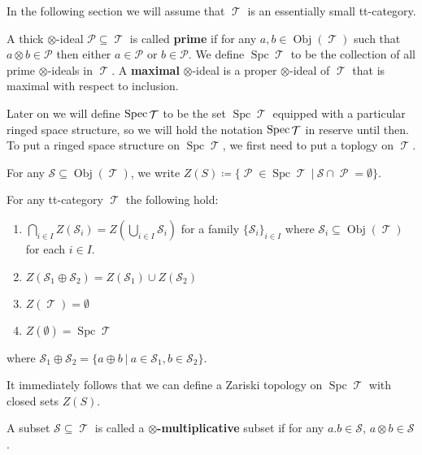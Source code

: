 \documentclass[11pt]{article}
\DeclareMathOperator{\ob}{Obj}
\DeclareMathOperator{\TT}{\mathcal{T}}
\DeclareMathOperator{\cP}{\mathcal{P}}
\DeclareMathOperator{\spc}{Spc}
\begin{document}
In the following section we will assume that $\TT$ is an essentially small tt-category.

\begin{defn}
A thick $\otimes$-ideal $\mathcal{P} \subseteq \TT$ is called \textbf{prime} if for any $a,b \in \ob(\TT)$ such that $a \otimes b \in \mathcal{P}$ then either $a \in \mathcal{P}$ or $b \in \mathcal{P}$. We define $\spc \TT$ to be the collection of all prime $\otimes$-ideals in $\TT$. A \textbf{maximal} $\otimes$-ideal is a proper $\otimes$-ideal of $\TT$ that is maximal with respect to inclusion.
\end{defn}

Later on we will define $\Spec \TT $ to be the set $\spc \TT$ equipped with a particular ringed space structure, so we will hold the notation $\Spec \TT$ in reserve until then. To put a ringed space structure on $\spc \TT$, we first need to put a toplogy on $\TT$.

\begin{defn}
For any $\mathcal{S} \subseteq \ob(\TT)$, we write $Z(S) \coloneqq \{\cP \in \spc \TT\:|\:\mathcal{S}\cap \cP = \emptyset\}$.
\end{defn}


\begin{prop}
For any tt-category $\TT$ the following hold:
\begin{enumerate}[1.]
	\item $\bigcap_{i \in I}Z(\mathcal{S}_i) = Z(\bigcup_{i \in I}\mathcal{S}_i)$ for a family $\{\mathcal{S}_i\}_{i \in I}$ where $\mathcal{S}_i \subseteq \ob(\TT)$ for each $i \in I$.
	\item $Z(\mathcal{S}_1 \oplus \mathcal{S}_2) = Z(\mathcal{S}_1) \cup Z(\mathcal{S}_2)$ 
	\item $Z(\TT) = \emptyset$
	\item $Z(\emptyset) = \spc \TT$
\end{enumerate}
where $\mathcal{S}_1 \oplus \mathcal{S}_2 = \{a \oplus b\:|\: a \in \mathcal{S}_1, b \in \mathcal{S}_2\}$.
\end{prop}

It immediately follows that we can define a Zariski topology on $\spc \TT$ with closed sets $Z(S)$.

\begin{defn}
A subset $\mathcal{S} \subseteq \TT$ is called a \textbf{$\otimes$-multiplicative} subset if for any $a.b \in \mathcal{S}$, $a \otimes b \in \mathcal{S}$.
\end{defn}
\end{document}
